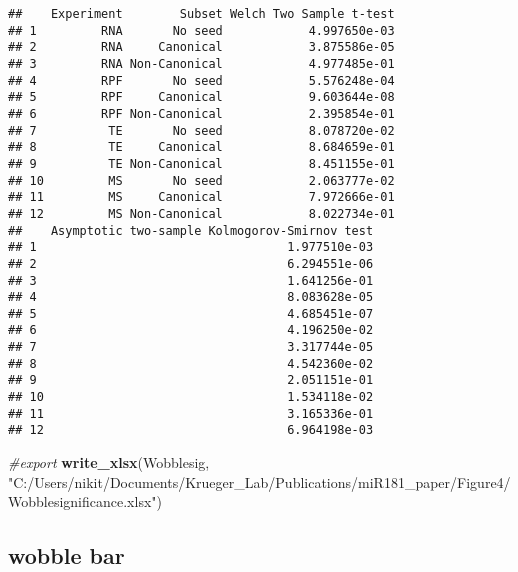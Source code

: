 \documentclass[
]{article}
\newenvironment{Shaded}{\begin{snugshade}}{\end{snugshade}}
\newcommand{\AttributeTok}[1]{\textcolor[rgb]{0.13,0.29,0.53}{#1}}
\newcommand{\CommentTok}[1]{\textcolor[rgb]{0.56,0.35,0.01}{\textit{#1}}}
\newcommand{\FunctionTok}[1]{\textcolor[rgb]{0.13,0.29,0.53}{\textbf{#1}}}
\newcommand{\NormalTok}[1]{#1}
\newcommand{\OtherTok}[1]{\textcolor[rgb]{0.56,0.35,0.01}{#1}}
\newcommand{\SpecialCharTok}[1]{\textcolor[rgb]{0.81,0.36,0.00}{\textbf{#1}}}
\newcommand{\StringTok}[1]{\textcolor[rgb]{0.31,0.60,0.02}{#1}}
\begin{document}
\begin{verbatim}
##    Experiment        Subset Welch Two Sample t-test
## 1         RNA       No seed            4.997650e-03
## 2         RNA     Canonical            3.875586e-05
## 3         RNA Non-Canonical            4.977485e-01
## 4         RPF       No seed            5.576248e-04
## 5         RPF     Canonical            9.603644e-08
## 6         RPF Non-Canonical            2.395854e-01
## 7          TE       No seed            8.078720e-02
## 8          TE     Canonical            8.684659e-01
## 9          TE Non-Canonical            8.451155e-01
## 10         MS       No seed            2.063777e-02
## 11         MS     Canonical            7.972666e-01
## 12         MS Non-Canonical            8.022734e-01
##    Asymptotic two-sample Kolmogorov-Smirnov test
## 1                                   1.977510e-03
## 2                                   6.294551e-06
## 3                                   1.641256e-01
## 4                                   8.083628e-05
## 5                                   4.685451e-07
## 6                                   4.196250e-02
## 7                                   3.317744e-05
## 8                                   4.542360e-02
## 9                                   2.051151e-01
## 10                                  1.534118e-02
## 11                                  3.165336e-01
## 12                                  6.964198e-03
\end{verbatim}

\begin{Shaded}
\begin{Highlighting}[]
\CommentTok{\#export}
\FunctionTok{write\_xlsx}\NormalTok{(Wobblesig, }\StringTok{"C:/Users/nikit/Documents/Krueger\_Lab/Publications/miR181\_paper/Figure4/Wobblesignificance.xlsx"}\NormalTok{)}
\end{Highlighting}
\end{Shaded}

\hypertarget{wobble-bar}{%
\subsection{wobble bar}\label{wobble-bar}}

\begin{Shaded}
\end{Shaded}
\end{document}
